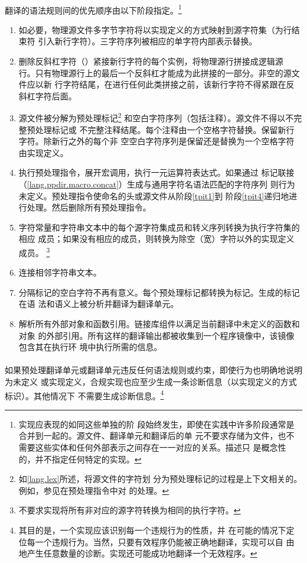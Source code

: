\paragraph{}
翻译的语法规则间的优先顺序由以下阶段指定。\footnote{实现应表现的如同这些单独的阶
段始终发生，即使在实践中许多阶段通常是合并到一起的。源文件、翻译单元和翻译后的单
元不要求存储为文件，也不需要这些实体和任何外部表示之间存在一一对应的关系。描述只
是概念性的，并不指定任何特定的实现。}
\begin{enumerate}
  \newcommand{\tpit}[1]{\item{#1\label{tpit\arabic{enumi}}}}
  \tpit{如必要，物理源文件多字节字符将以实现定义的方式映射到源字符集（为行结束符
    引入新行字符）。三字符序列被相应的单字符内部表示替换。}
  \tpit{删除反斜杠字符（\tm{\bs}）紧接新行字符的每个实例，将物理源行拼接成逻辑源
    行。只有物理源行上的最后一个反斜杠才能成为此拼接的一部分。非空的源文件应以新
    行字符结尾，在进行任何此类拼接之前，该新行字符不得紧跟在反斜杠字符后面。}
  \tpit{源文件被分解为预处理标记\footnote{如\ref{lang.lex}所述，将源文件的字符划
    分为预处理标记的过程是上下文相关的。例如，参见在\tm{\#include}预处理指令中对
    \tm{<}的处理。} 和空白字符序列（包括注释）。源文件不得以不完整预处理标记或
    不完整注释结尾。每个注释由一个空格字符替换。保留新行字符。除新行之外的每个非
    空空白字符序列是保留还是替换为一个空格字符由实现定义。}
  \tpit{执行预处理指令，展开宏调用，执行一元运算符表达式。如果通过
    标记联接（\ref{lang.ppdir.macro.concat}）生成与通用字符名语法匹配的字符序列
    则行为未定义。\tm{\#include}预处理指令使命名的头或源文件从阶段\ref{tpit1}到
    阶段\ref{tpit4}递归地进行处理。然后删除所有预处理指令。}
  \tpit{字符常量和字符串文本中的每个源字符集成员和转义序列转换为执行字符集的相应
    成员；如果没有相应的成员，则转换为除空（宽）字符以外的实现定义成员。
    \footnote{不要求实现将所有非对应的源字符转换为相同的执行字符。}}
  \tpit{连接相邻字符串文本。}
  \tpit{分隔标记的空白字符不再有意义。每个预处理标记都转换为标记。生成的标记在语
    法和语义上被分析并翻译为翻译单元。}
  \tpit{解析所有外部对象和函数引用。链接库组件以满足当前翻译中未定义的函数和对象
    的外部引用。所有这样的翻译输出都被收集到一个程序镜像中，该镜像包含其在执行环
    境中执行所需的信息。}
\end{enumerate}


\paragraph{}
如果预处理翻译单元或翻译单元违反任何语法规则或约束，即使行为也明确地说明为未定义
或实现定义，合规实现也应至少生成一条诊断信息（以实现定义的方式标识）。其他情况下
不需要生成诊断信息。\footnote{其目的是，一个实现应该识别每一个违规行为的性质，并
在可能的情况下定位每一个违规行为。当然，只要有效程序仍能被正确地翻译，实现可以自
由地产生任意数量的诊断。实现还可能成功地翻译一个无效程序。}

